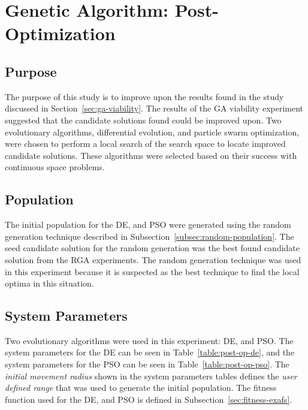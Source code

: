 \section{Genetic Algorithm: Post-Optimization}

\subsection{Purpose}

The purpose of this study is to improve upon the results found in the study discussed in Section~\ref{sec:ga-viability}. The results of the GA viability experiment suggested that the candidate solutions found could be improved upon. Two evolutionary algorithms, differential evolution, and particle swarm optimization, were chosen to perform a local search of the search space to locate improved candidate solutions. These algorithms were selected based on their success with continuous space problems.

\subsection{Population}

The initial population for the DE, and PSO were generated using the random generation technique described in Subsection~\ref{subsec:random-population}. The seed candidate solution for the random generation was the best found candidate solution from the RGA experiments. The random generation technique was used in this experiment because it is suspected as the best technique to find the local optima in this situation.


\subsection{System Parameters}

Two evolutionary algorithms were used in this experiment: DE, and PSO. The system parameters for the DE can be seen in Table~\ref{table:post-op-de}, and the system parameters for the PSO can be seen in Table~\ref{table:post-op-pso}. The \textit{initial movement radius} shown in the system parameters tables defines the \textit{user defined range} that was used to generate the initial population. The fitness function used for the DE, and PSO is defined in Subsection~\ref{sec:fitness-exafs}.

